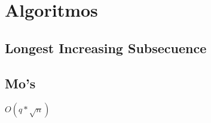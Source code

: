\section{Algoritmos}
\subsection{Longest Increasing Subsecuence}


\subsection{Mo's}
$O(q*\sqrt{n})$



